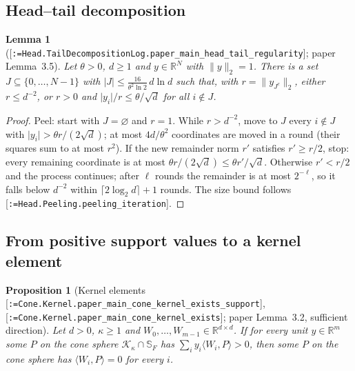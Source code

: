 \documentclass[11pt]{article}
\makeatletter
\newcommand{\formal@break}[1]{\@tfor\formal@tok:=#1\do{%
  \formal@tok
  \expandafter\ifx\formal@tok.\allowbreak\else
  \expandafter\ifx\formal@tok\_\allowbreak\fi\fi}}
\DeclareRobustCommand{\formal}[1]{\textnormal{[\texttt{\small\formal@break{#1}}]}}
\newcommand{\R}{\mathbb{R}}
\newcommand{\ip}[2]{\langle #1, #2\rangle}
\newcommand{\norm}[1]{\lVert #1\rVert}
\newcommand{\abs}[1]{\lvert #1\rvert}
\newcommand{\Fro}{F}
\newcommand{\sqd}{\sqrt{d}}
\newcommand{\cone}{\mathcal{K}}
\theoremstyle{plain}
\newtheorem{proposition}[theorem]{Proposition}
\newtheorem{lemma}[theorem]{Lemma}
\theoremstyle{definition}
\makeatother
\begin{document}
\subsection{Head--tail decomposition}

\begin{lemma}[\formal{Head.TailDecompositionLog.paper\_main\_head\_tail\_regularity}; paper Lemma~3.5]\label{lem:peel}
Let $\theta > 0$, $d \ge 1$ and $y \in \R^N$ with $\norm{y}_2 = 1$. There is a
set $J \subseteq \{0, \dots, N-1\}$ with $\abs{J} \le \frac{16}{\theta^2\ln 2}\,d\ln d$
such that, with $r = \norm{y_{J^c}}_2$, either $r \le d^{-2}$, or $r > 0$ and
$\abs{y_i}/r \le \theta/\sqd$ for all $i \notin J$.
\end{lemma}

\begin{proof}
Peel: start with $J = \varnothing$ and $r = 1$. While $r > d^{-2}$, move to
$J$ every $i \notin J$ with $\abs{y_i} > \theta r/(2\sqd)$; at most
$4d/\theta^2$ coordinates are moved in a round (their squares sum to at
most $r^2$). If the new remainder norm $r'$ satisfies $r' \ge r/2$, stop: every
remaining coordinate is at most $\theta r/(2\sqd) \le \theta r'/\sqd$.
Otherwise $r' < r/2$ and the process continues; after $\ell$ rounds the
remainder is at most $2^{-\ell}$, so it falls below $d^{-2}$ within
$\lceil 2\log_2 d\rceil + 1$ rounds. The size bound follows
\formal{Head.Peeling.peeling\_iteration}.
\end{proof}

\subsection{From positive support values to a kernel element}

\begin{proposition}[Kernel elements \formal{Cone.Kernel.paper\_main\_cone\_kernel\_exists\_support}, \formal{Cone.Kernel.paper\_main\_cone\_kernel\_exists}; paper Lemma~3.2, sufficient direction]\label{prop:kernel}
Let $d > 0$, $\kappa \ge 1$ and $W_0, \dots, W_{m-1} \in \R^{d\times d}$. If for
every unit $y \in \R^m$ some $P$ on the cone sphere $\cone_\kappa\cap\mathbb{S}_\Fro$
has $\sum_iy_i\ip{W_i}{P} > 0$, then some $P$ on the cone sphere has
$\ip{W_i}{P} = 0$ for every $i$.
\end{proposition}
\end{document}

